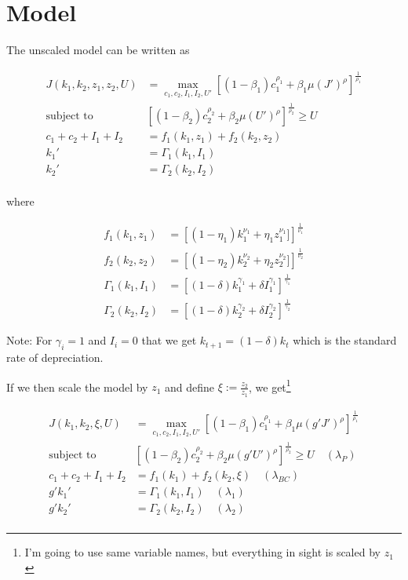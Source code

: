 \documentclass[10pt]{article}
\begin{document}
\section{Model}

  The unscaled model can be written as

  \begin{align*}
    J(k_1, k_2, z_1, z_2, U) &= \max_{c_1, c_2, I_1, I_2, U'} \left[ (1 - \beta_1) c_1^{\rho_1} + \beta_1 \mu(J')^\rho \right]^{\frac{1}{\rho_1}} \\
    \text{subject to }& \left[ (1 - \beta_2) c_2^{\rho_2} + \beta_2 \mu(U')^\rho \right]^{\frac{1}{\rho_2}} \ge U \\
    c_1 + c_2 + I_1 + I_2 &= f_1(k_1, z_1) + f_2(k_2, z_2) \\
    k_1' &= \Gamma_1(k_1, I_1) \\
    k_2' &= \Gamma_2(k_2, I_2) \\
  \end{align*}

  where

  \begin{align*}
    f_1(k_1, z_1) &= \left[(1 - \eta_1) k_1^{\nu_1} + \eta_1 z_1^{\nu_1}] \right]^{\frac{1}{\nu_1}} \\
    f_2(k_2, z_2) &= \left[(1 - \eta_2) k_2^{\nu_2} + \eta_2 z_2^{\nu_2}] \right]^{\frac{1}{\nu_2}} \\
    \Gamma_1(k_1, I_1) &= \left[(1 - \delta) k_1^{\gamma_1} + \delta I_1^{\gamma_1} \right]^{\frac{1}{\gamma_1}} \\
    \Gamma_2(k_2, I_2) &= \left[(1 - \delta) k_2^{\gamma_2} + \delta I_2^{\gamma_2} \right]^{\frac{1}{\gamma_2}}
  \end{align*}

  Note: For $\gamma_i = 1$ and $I_i = 0$ that we get $k_{t+1} = (1 - \delta) k_t$ which is the standard rate of depreciation.

  If we then scale the model by $z_1$ and define $\xi := \frac{z_2}{z_1}$, we get\footnote{I'm going to use same variable names, but everything in sight is scaled by $z_1$}

  \begin{align*}
    J(k_1, k_2, \xi, U) &= \max_{c_1, c_2, I_1, I_2, U'} \left[ (1 - \beta_1) c_1^{\rho_1} + \beta_1 \mu(g' J')^\rho \right]^{\frac{1}{\rho_1}} \\
    \text{subject to }& \left[ (1 - \beta_2) c_2^{\rho_2} + \beta_2 \mu(g' U')^\rho \right]^{\frac{1}{\rho_2}} \ge U \quad (\lambda_P) \\
    c_1 + c_2 + I_1 + I_2 &= f_1(k_1) + f_2(k_2, \xi) \quad (\lambda_{BC}) \\
    g' k_1' &= \Gamma_1(k_1, I_1) \quad (\lambda_1) \\
    g' k_2' &= \Gamma_2(k_2, I_2) \quad (\lambda_2) \\
  \end{align*}
\end{document}
